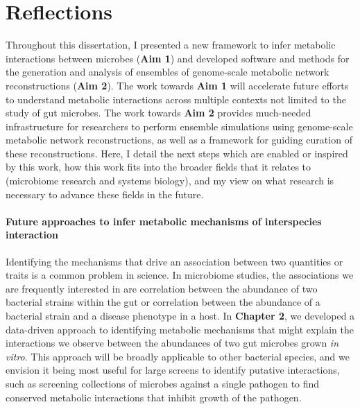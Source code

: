 \documentclass[11pt,twocolumn,notitlepage,openany,twoside]{book}
\begin{document}
\chapter{Reflections}
\begin{refsection}

Throughout this dissertation, I presented a new framework to infer metabolic interactions between microbes (\textbf{Aim 1}) and developed software and methods for the generation and analysis of ensembles of genome-scale metabolic network reconstructions (\textbf{Aim 2}). The work towards \textbf{Aim 1} will accelerate future efforts to understand metabolic interactions across multiple contexts not limited to the study of gut microbes. The work towards \textbf{Aim 2} provides much-needed infrastructure for researchers to perform ensemble simulations using genome-scale metabolic network reconstructions, as well as a framework for guiding curation of these reconstructions. Here, I detail the next steps which are enabled or inspired by this work, how this work fits into the broader fields that it relates to (microbiome research and systems biology), and my view on what research is necessary to advance these fields in the future.

\subsubsection{Future approaches to infer metabolic mechanisms of interspecies interaction}

Identifying the mechanisms that drive an association between two quantities or traits is a common problem in science. In microbiome studies, the associations we are frequently interested in are correlation between the abundance of two bacterial strains within the gut or correlation between the abundance of a bacterial strain and a disease phenotype in a host. In \textbf{Chapter 2}, we developed a data-driven approach to identifying metabolic mechanisms that might explain the interactions we observe between the abundances of two gut microbes grown \textit{in vitro}. This approach will be broadly applicable to other bacterial species, and we envision it being most useful for large screens to identify putative interactions, such as screening collections of microbes against a single pathogen to find conserved metabolic interactions that inhibit growth of the pathogen.


\end{refsection}
\end{document}
